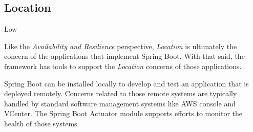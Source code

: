 \subsection*{Location}

\ranking Low

Like the \textit{Availability and Resilience} perspective, \textit{Location} is ultimately the concern of the applications that implement Spring Boot. With that said, the framework has tools to support the \textit{Location} concerns of those applications.

Spring Boot can be installed locally to develop and test an application that is deployed remotely.  Concerns related to those remote systems are typically handled by standard software management systems like AWS console and VCenter. The Spring Boot Actuator module supports efforts to monitor the health of those systems.